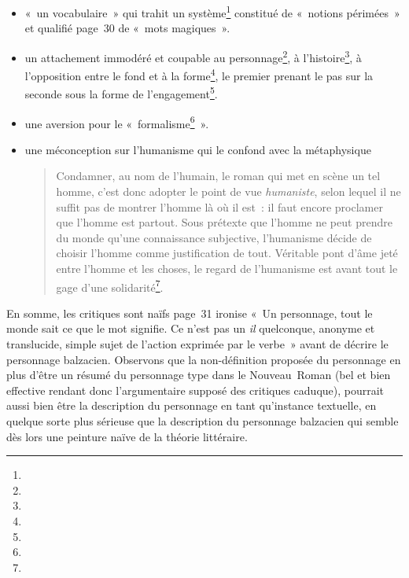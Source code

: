 \documentclass[12pt, a4paper]{article}
\begin{document}
\begin{itemize}
    \item «~un vocabulaire~» qui trahit un système\footnote{} constitué de «~notions périmées~» et qualifié page~30 de «~mots magiques~».
    \item un attachement immodéré et coupable au personnage\footnote{}, à l'histoire\footnote{}, à l'opposition entre le fond et à la forme\footnote{}, le premier prenant le pas sur la seconde sous la forme de l'engagement\footnote{}.
    \item une aversion pour le «~formalisme\footnote{}~».
    \item une méconception sur l'humanisme qui le confond avec la métaphysique
    \begin{quote}
        Condamner, au nom de l’humain, le roman qui met en scène un tel homme, c’est donc adopter le point de vue \textit{humaniste}, selon lequel il ne suffit pas de montrer l’homme là où il est~: il faut encore proclamer que l’homme est partout. Sous prétexte que l’homme ne peut prendre du monde qu’une connaissance subjective, l’humanisme décide de choisir l’homme comme justification de tout. Véritable pont d’âme jeté entre l’homme et les choses, le regard de l’humanisme est avant tout le gage d’une solidarité\footnote{}.
    \end{quote} 
\end{itemize}

En somme, les critiques sont naïfs page~31 \robbe{} ironise «~Un personnage, tout le monde sait ce que le mot signifie. Ce n’est pas un \textit{il} quelconque, anonyme et translucide, simple sujet de l’action exprimée par le verbe~» avant de décrire le personnage balzacien. Observons que la non-définition proposée du personnage en plus d'être un résumé du personnage type dans le Nouveau~Roman (bel et bien effective rendant donc l'argumentaire supposé des critiques caduque), pourrait aussi bien être la description du personnage en tant qu'instance textuelle, en quelque sorte plus sérieuse que la description du personnage balzacien qui semble dès lors une peinture naïve de la théorie littéraire. %
\end{document}
